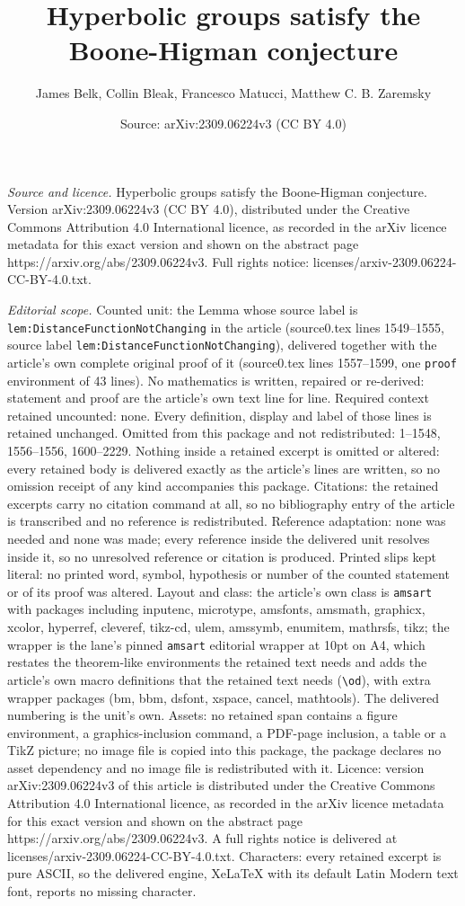 \documentclass[10pt,a4paper]{amsart}
\title[Hyperbolic groups satisfy the Boone-Higman conjecture]{Hyperbolic groups satisfy the Boone-Higman conjecture}
\author{James Belk, Collin Bleak, Francesco Matucci, Matthew C. B. Zaremsky}
\date{Source: arXiv:2309.06224v3 (CC BY 4.0)}
\begin{document}
\maketitle

\noindent\emph{Source and licence.} Hyperbolic groups satisfy the Boone-Higman conjecture. Version arXiv:2309.06224v3 (CC BY 4.0), distributed under the Creative Commons Attribution 4.0 International licence, as recorded in the arXiv licence metadata for this exact version and shown on the abstract page https://arxiv.org/abs/2309.06224v3. Full rights notice: licenses/arxiv-2309.06224-CC-BY-4.0.txt.\par\smallskip

\noindent\textit{Editorial scope.} Counted unit: the Lemma whose source label is \texttt{lem:DistanceFunctionNotChanging} in the article (source0.tex lines 1549--1555, source label \texttt{lem:DistanceFunctionNotChanging}), delivered together with the article's own complete original proof of it (source0.tex lines 1557--1599, one \texttt{proof} environment of 43 lines). No mathematics is written, repaired or re-derived: statement and proof are the article's own text line for line. Required context retained uncounted: none. Every definition, display and label of those lines is retained unchanged. Omitted from this package and not redistributed: 1--1548, 1556--1556, 1600--2229. Nothing inside a retained excerpt is omitted or altered: every retained body is delivered exactly as the article's lines are written, so no omission receipt of any kind accompanies this package. Citations: the retained excerpts carry no citation command at all, so no bibliography entry of the article is transcribed and no reference is redistributed. Reference adaptation: none was needed and none was made; every reference inside the delivered unit resolves inside it, so no unresolved reference or citation is produced. Printed slips kept literal: no printed word, symbol, hypothesis or number of the counted statement or of its proof was altered. Layout and class: the article's own class is \texttt{amsart} with packages including inputenc, microtype, amsfonts, amsmath, graphicx, xcolor, hyperref, cleveref, tikz-cd, ulem, amssymb, enumitem, mathrsfs, tikz; the wrapper is the lane's pinned \texttt{amsart} editorial wrapper at 10pt on A4, which restates the theorem-like environments the retained text needs and adds the article's own macro definitions that the retained text needs (\texttt{\textbackslash od}), with extra wrapper packages (bm, bbm, dsfont, xspace, cancel, mathtools). The delivered numbering is the unit's own. Assets: no retained span contains a figure environment, a graphics-inclusion command, a PDF-page inclusion, a table or a TikZ picture; no image file is copied into this package, the package declares no asset dependency and no image file is redistributed with it. Licence: version arXiv:2309.06224v3 of this article is distributed under the Creative Commons Attribution 4.0 International licence, as recorded in the arXiv licence metadata for this exact version and shown on the abstract page https://arxiv.org/abs/2309.06224v3. A full rights notice is delivered at licenses/arxiv-2309.06224-CC-BY-4.0.txt. Characters: every retained excerpt is pure ASCII, so the delivered engine, XeLaTeX with its default Latin Modern text font, reports no missing character.
\end{document}
